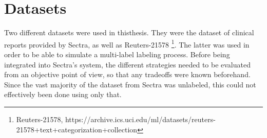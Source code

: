 \section{Datasets}\label{sec:datasets}

Two different datasets were used in thisthesis.
They were the dataset of clinical reports provided by Sectra, as well as Reuters-21578 \footnote{Reuters-21578, https://archive.ics.uci.edu/ml/datasets/reuters-21578+text+categorization+collection}.
The latter was used in order to be able to simulate a multi-label labeling process.
Before being integrated into Sectra's system, the different strategies needed to be evaluated from an objective point of view, so that any tradeoffs were known beforehand.
Since the vast majority of the dataset from Sectra was unlabeled, this could not effectively been done using only that.

